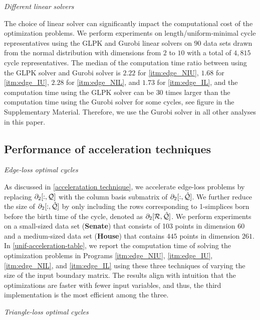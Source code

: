 \noindent \emph{Different linear solvers}

The choice of linear solver can significantly impact the computational cost of the optimization problems. We perform experiments on length/uniform-minimal cycle representatives using the GLPK \cite{glpk} and Gurobi \cite{gurobi} linear solvers on $90$ data sets drawn from the normal distribution with dimensions from $2$ to $10$ with a total of $4{,}815$ cycle representatives. The median of the computation time ratio between using the GLPK solver and Gurobi solver is $2.22$ for \pr
\ref{itm:edge_NIU}, $1.68$ for \pr \ref{itm:edge_IU}, $2.28$ for \pr \ref{itm:edge_NIL}, and $1.73$ for \pr \ref{itm:edge_IL}, and the computation time using the GLPK solver can be $30$ times larger than the computation time using the Gurobi solver for some cycles, see figure in the Supplementary Material. Therefore, we use the Gurobi solver in all other analyses in this paper. 



 

\subsection{Performance of acceleration techniques} \label{accelerateresults}

\noindent \emph{Edge-loss optimal cycles} 

As discussed in \se \ref{acceleratation technique}, we accelerate edge-loss problems by replacing $\partial_2[:, \mathcal Q]$ with the column basis submatrix of $\partial_2[:, \hat {\mathcal Q}]$. We further reduce the size of $\partial_2[:, \hat {\mathcal Q}]$ by only including the rows corresponding to 1-simplices born before the birth time of the cycle, denoted as $\partial_2[\mathcal R, \hat {\mathcal Q}]$. We perform experiments on a small-sized data set (\textbf{Senate}) that consists of 103 points in dimension $60$ and a medium-sized data set (\textbf{House}) that contains $445$ points in dimension $261$. In \tab
\ref{unif-acceleration-table}, we report the computation time of solving the optimization problems in Programs \ref{itm:edge_NIU}, \ref{itm:edge_IU}, \ref{itm:edge_NIL}, and \ref{itm:edge_IL} using these three techniques of varying the size of the input boundary matrix. The results align with intuition that the optimizations are faster with fewer input variables, and thus, the third implementation is the most efficient among the three.

\noindent \emph{Triangle-loss optimal cycles}

